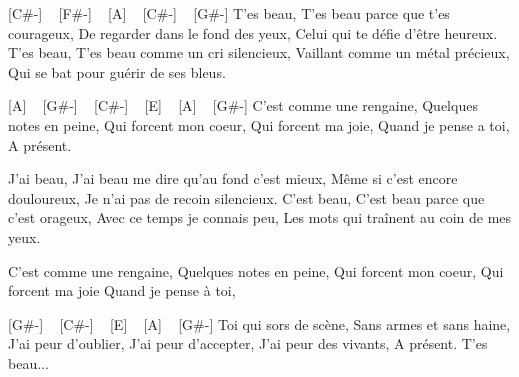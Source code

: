[C#-] ~ [F#-] ~ [A] ~ [C#-] ~ [G#-]
T'es beau,
T'es beau parce que t'es courageux,
De regarder dans le fond des yeux,
Celui qui te défie d'être heureux.
T'es beau,
T'es beau comme un cri silencieux,
Vaillant comme un métal précieux,
Qui se bat pour guérir de ses bleus.

[A] ~ [G#-] ~ [C#-] ~ [E] ~ [A] ~ [G#-]
C'est comme une rengaine,
Quelques notes en peine,
Qui forcent mon coeur,
Qui forcent ma joie,
Quand je pense a toi,
A présent.

J'ai beau,
J'ai beau me dire qu'au fond c'est mieux,
Même si c'est encore douloureux,
Je n'ai pas de recoin silencieux.
C'est beau,
C'est beau parce que c'est orageux,
Avec ce temps je connais peu,
Les mots qui traînent au coin de mes yeux.

C'est comme une rengaine,
Quelques notes en peine,
Qui forcent mon coeur,
Qui forcent ma joie
Quand je pense à  toi,

[G#-] ~ [C#-] ~ [E] ~ [A] ~ [G#-]
Toi qui sors de scène,
Sans armes et sans haine,
J'ai peur d'oublier,
J'ai peur d'accepter,
J'ai peur des vivants,
A présent.
T'es beau... 